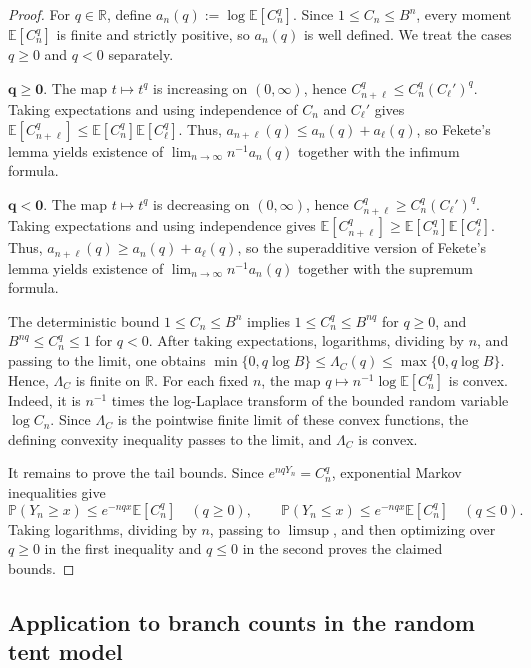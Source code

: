 \documentclass[11pt]{amsart}
\numberwithin{equation}{section}
\theoremstyle{plain}
\theoremstyle{definition}
\theoremstyle{remark}
\begin{document}
\begin{proof}
	For \(q\in\mathbb R\), define \(a_n(q):=\log\mathbb E[C_n^q]\). Since \(1\le C_n\le B^n\), every moment \(\mathbb E[C_n^q]\) is finite and strictly positive, so \(a_n(q)\) is well defined. We treat the cases \(q \ge 0\) and \(q < 0\) separately.
	\medskip

\noindent	\(\boldsymbol{q\ge0}\). The map \(t\mapsto t^q\) is increasing on \((0,\infty)\), hence \(C_{n+\ell}^q\le C_n^q(C_\ell')^q\). Taking expectations and using independence of \(C_n\) and \(C_\ell'\) gives \(\mathbb E[C_{n+\ell}^q]\le\mathbb E[C_n^q]\mathbb E[C_\ell^q]\). Thus, \(a_{n+\ell}(q)\le a_n(q)+a_\ell(q)\), so Fekete's lemma yields existence of \(\lim_{n\to\infty} n^{-1}a_n(q)\) together with the infimum formula.
\medskip

	\noindent\(\boldsymbol{q<0}\). The map \(t\mapsto t^q\) is decreasing on \((0,\infty)\), hence \(C_{n+\ell}^q\ge C_n^q(C_\ell')^q\). Taking expectations and using independence gives \(\mathbb E[C_{n+\ell}^q]\ge\mathbb E[C_n^q]\mathbb E[C_\ell^q]\). Thus, \(a_{n+\ell}(q)\ge a_n(q)+a_\ell(q)\), so the superadditive version of Fekete's lemma yields existence of \(\lim_{n\to\infty} n^{-1}a_n(q)\) together with the supremum formula.

The deterministic bound \(1\le C_n\le B^n\) implies \(1\le C_n^q\le B^{nq}\) for \(q\ge0\), and \(B^{nq}\le C_n^q\le1\) for \(q<0\). After taking expectations, logarithms, dividing by \(n\), and passing to the limit, one obtains \(\min\{0,q\log B\}\le\Lambda_C(q)\le\max\{0,q\log B\}\). Hence, \(\Lambda_C\) is finite on \(\mathbb R\).
For each fixed \(n\), the map \(q\mapsto n^{-1}\log\mathbb E[C_n^q]\) is convex. Indeed, it is \(n^{-1}\) times the log-Laplace transform of the bounded random variable \(\log C_n\). Since \(\Lambda_C\) is the pointwise finite limit of these convex functions, the defining convexity inequality passes to the limit, and \(\Lambda_C\) is convex.

It remains to prove the tail bounds. Since \(e^{nqY_n}=C_n^q\), exponential Markov inequalities give
\[
\mathbb P(Y_n\ge x)\le e^{-nqx}\mathbb E[C_n^q]\quad(q\ge0),
\qquad
\mathbb P(Y_n\le x)\le e^{-nqx}\mathbb E[C_n^q]\quad(q\le0).
\]
Taking logarithms, dividing by \(n\), passing to \(\limsup\), and then optimizing over \(q\ge0\) in the first inequality and \(q\le0\) in the second proves the claimed bounds.
\end{proof}

\subsection{Application to branch counts in the random tent model}
\end{document}

